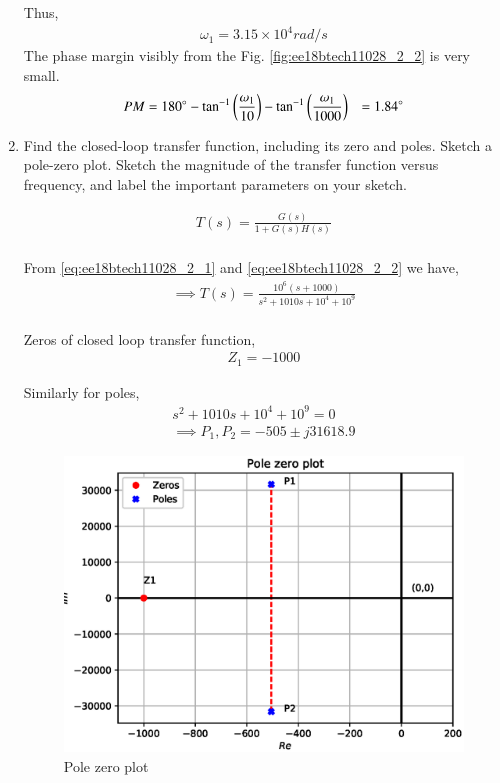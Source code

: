 \begin{enumerate}[label=\arabic*.,ref=\theenumi]
Thus, 
\begin{align}
     \omega_{1} = 3.15 \times 10^{4} rad/s
\end{align}
The phase margin visibly from the Fig. \ref{fig:ee18btech11028_2_2} is very small.
\begin{align}
    PM &= 180 \degree - \tan^{-1}\left(\frac{\omega_{1}}{10}\right) - \tan^{-1}\left(\frac{\omega_{1}}{1000}\right)
      & = 1.84 \degree
\end{align}

\item Find the closed-loop transfer function, including its zero
and poles. Sketch a pole-zero plot. Sketch the magnitude of
the transfer function versus frequency, and label the important parameters on your sketch.
\\ 
\solution

\begin{align}
    T(s) = \frac{G(s)}{1 + G(s)H(s)}
    \\
\end{align}

From \eqref{eq:ee18btech11028_2_1} and \eqref{eq:ee18btech11028_2_2} we have,
\begin{align}
    \implies T(s) = \frac{10^{6}(s+1000)}{s^{2} + 1010s + 10^{4} + 10^{9}}
    \\
     \label{eq:ee18btech11028_2_3}
\end{align}

Zeros of closed loop transfer function,
\begin{align}
    Z_{1} = -1000
\end{align}

Similarly for poles,
\begin{align}
    s^{2} + 1010s + 10^{4} + 10^{9} = 0
    \\
    \implies P_{1}, P_{2} = -505 \pm j31618.9
\end{align}

\begin{figure}[!ht]
    \centering
    \includegraphics[width=\columnwidth]{./figs/ee18btech11028/fig_3.eps}
    \caption{Pole zero plot}
    \label{fig:ee18btech11028_2_3}
\end{figure}



\end{enumerate}
